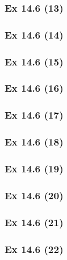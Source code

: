 \subsubsection{Ex 14.6 (13)}\label{sec:Ex_14.6.13}

\subsubsection{Ex 14.6 (14)}\label{sec:Ex_14.6.14}

\subsubsection{Ex 14.6 (15)}\label{sec:Ex_14.6.15}

\subsubsection{Ex 14.6 (16)}\label{sec:Ex_14.6.16}

\subsubsection{Ex 14.6 (17)}\label{sec:Ex_14.6.17}

\subsubsection{Ex 14.6 (18)}\label{sec:Ex_14.6.18}

\subsubsection{Ex 14.6 (19)}\label{sec:Ex_14.6.19}

\subsubsection{Ex 14.6 (20)}\label{sec:Ex_14.6.20}

\newpage		%

\subsubsection{Ex 14.6 (21)}\label{sec:Ex_14.6.21}

\subsubsection{Ex 14.6 (22)}\label{sec:Ex_14.6.22}

